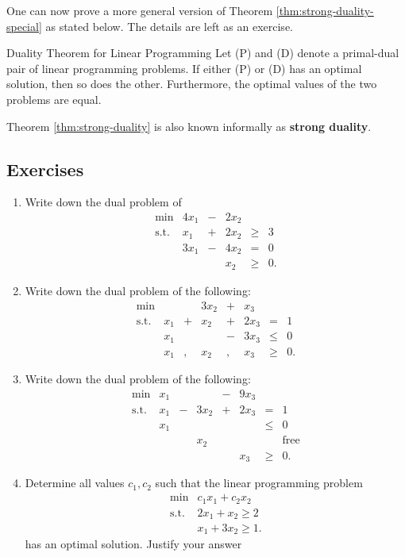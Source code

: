 One can now prove a more general version of Theorem
\ref{thm:strong-duality-special} as stated below. The details are left
as an exercise.

\begin{theorem}{Duality Theorem for Linear Programming}{}
\protect\hypertarget{thm:strong-duality}{}{\label{thm:strong-duality}
\iffalse (Duality Theorem for Linear Programming) \fi{} } Let (P) and
(D) denote a primal-dual pair of linear programming problems. If either
(P) or (D) has an optimal solution, then so does the other. Furthermore,
the optimal values of the two problems are equal.
\end{theorem}

Theorem \ref{thm:strong-duality} is also known informally as
\textbf{strong duality}.

\subsection*{Exercises}\label{exercises-6}

\begin{enumerate}
\def\labelenumi{\arabic{enumi}.}
\item
  Write down the dual problem of \[\begin{array}{rrcrcl}
  \min & 4x_1 & - & 2x_2 \\
  \text{s.t.} 
   & x_1 & + & 2x_2 & \geq & 3\\
   & 3x_1 & - & 4x_2 & = & 0 \\
   &  & & x_2 & \geq & 0.
  \end{array}\]
\item
  Write down the dual problem of the following: \[
  \begin{array}{rrcrcrcl}
  \min  &    &  &3x_2  & + & x_3 \\
  \mbox{s.t.}
   & x_1 & + & x_2 & + & 2x_3 & = & 1 \\
   & x_1 &   &     & - & 3x_3 & \leq & 0 \\
   & x_1 & , & x_2 & , & x_3 & \geq & 0.
  \end{array}
  \]
\item
  Write down the dual problem of the following: \[
  \begin{array}{rrcrcrcl}
  \min  & x_1 &  &  & - & 9x_3 \\
  \mbox{s.t.}
   & x_1 & - & 3x_2 &  + & 2x_3 & = & 1 \\
   & x_1 & &  & &  & \leq & 0 \\
   & &  & x_2 & &  &  & \mbox{free} \\
   & &  & &  & x_3 & \geq & 0.
  \end{array}\]
\item
  Determine all values \(c_1,c_2\) such that the linear programming
  problem \[\begin{array}{rl}
  \min & c_1 x_1 + c_2 x_2 \\
  \text{s.t.} & 2x_1 + x_2 \geq 2 \\
  & x_1 + 3x_2 \geq 1.
  \end{array}
  \] has an optimal solution. Justify your answer
\end{enumerate}

